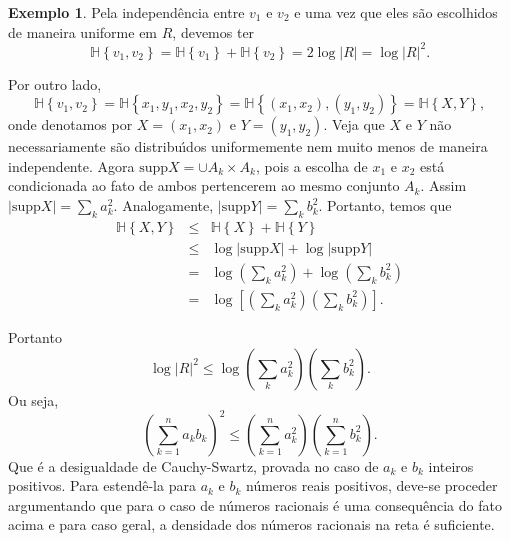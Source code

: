 \documentclass{amsart}
\theoremstyle{theorem}
\theoremstyle{definition}
\newtheorem{ex}{Exemplo}[section]
\theoremstyle{remark}
\numberwithin{equation}{section}
\newcommand{\HH}[1]{\mathbb{H}\left\{ #1 \right\}}
\newcommand{\supp}[1]{\mathrm{supp} #1}
\begin{document}
\begin{ex}
    Pela independ\^{e}ncia entre $v_1$ e $v_2$ e uma vez que eles s\~{a}o escolhidos de maneira uniforme em $R$, devemos ter
    \begin{equation*}
      \HH{v_1,v_2} = \HH{v_1} + \HH{v_2} = 2\log{|R|} = \log{|R|^2}.
    \end{equation*}

    Por outro lado,
    \begin{equation*}
      \HH{v_1,v_2} = \HH{x_1,y_1,x_2,y_2} = \HH{(x_1,x_2),(y_1,y_2)} = \HH{X,Y},
    \end{equation*}
    onde denotamos por $X = (x_1,x_2)$ e $Y = (y_1,y_2)$. Veja que $X$ e $Y$ n\~{a}o necessariamente s\~{a}o distribu\'{\i}dos uniformemente nem muito menos de maneira independente. Agora $\supp{X} = \cup A_k \times A_k$, pois a escolha de $x_1$ e $x_2$ est\'{a} condicionada ao fato de ambos pertencerem ao mesmo conjunto $A_k$. Assim $|\supp{X}| = \sum_k a_k^2$. Analogamente, $|\supp{Y}| = \sum_k b_k^2$. Portanto, temos que
    \begin{equation*}
    \begin{array}{rcl}
      \HH{X,Y} &\leq& \HH{X} + \HH{Y}\\
       &\leq& \log{|\supp{X}|} + \log{|\supp{Y}|}\\
       &=& \displaystyle \log{\left(\sum_k a_k^2 \right)} + \log{\left(\sum_k b_k^2 \right)}\\
       &=& \displaystyle \log{\left[\left(\sum_k a_k^2 \right)\left(\sum_k b_k^2 \right)\right]}.
    \end{array}
    \end{equation*}

    Portanto
    \begin{equation*}
      \log{|R|^2} \leq \log{\left(\sum_k a_k^2 \right)\left(\sum_k b_k^2 \right)}.
    \end{equation*}
    Ou seja,
    \begin{equation*}
      \left(\sum_{k=1}^{n} a_k b_k \right)^2 \leq \left(\sum_{k=1}^{n} a_k^2 \right)\left(\sum_{k=1}^{n} b_k^2 \right).
    \end{equation*}
    Que \'{e} a desigualdade de Cauchy-Swartz, provada no caso de $a_k$ e $b_k$ inteiros positivos. Para estend\^{e}-la para $a_k$ e $b_k$ n\'{u}meros reais positivos, deve-se proceder argumentando que para o caso de n\'{u}meros racionais \'{e} uma consequ\^{e}ncia do fato acima e para caso geral, a densidade dos n\'{u}meros racionais na reta \'{e} suficiente.
\end{ex}
\end{document}
